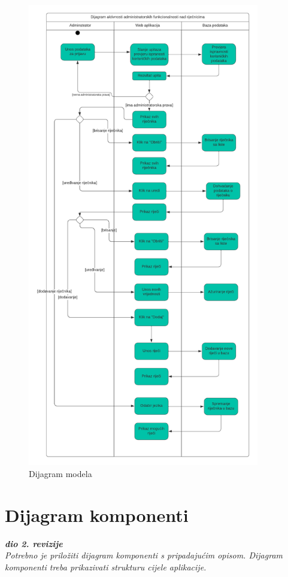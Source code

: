         \begin{figure}[H]
            \includegraphics[width=0.9\textwidth]{dijagrami/Dijagram Aktivnosti.png} 
            \centering
            \caption{Dijagram modela}
            \label{fig:class_diagram}
        \end{figure}	

			\eject
		\section{Dijagram komponenti}
		
			\textbf{\textit{dio 2. revizije}}\\
		
			 \textit{Potrebno je priložiti dijagram komponenti s pripadajućim opisom. Dijagram komponenti treba prikazivati strukturu cijele aplikacije.}
